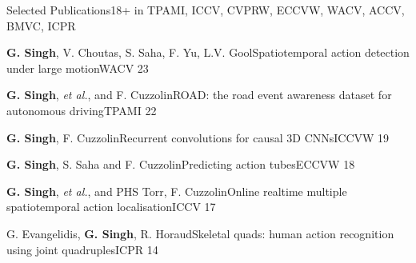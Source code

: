 \documentclass{resume} %
\begin{document}
\vspace{0.1in}
\begin{rSection}{Selected Publications}{18+\footnotesize{ in TPAMI, ICCV, CVPRW, ECCVW, WACV, ACCV, BMVC, ICPR}}
  \begin{pSubsection}{\textbf{G. Singh}, V. Choutas, S. Saha, F. Yu, L.V. Gool}{Spatiotemporal action detection under large motion}{WACV}{ 23}\end{pSubsection}
  \begin{pSubsection}{\textbf{G. Singh}, \textit{et al.}, and
    F. Cuzzolin}{ROAD: the road event awareness dataset for autonomous driving}{TPAMI}{ 22}\end{pSubsection}
  \begin{pSubsection}{\textbf{G. Singh}, F. Cuzzolin}{Recurrent convolutions for causal 3D CNNs}{ICCVW}{ 19}\end{pSubsection}
  \begin{pSubsection}{\textbf{G. Singh}, S. Saha and F. Cuzzolin}{Predicting action tubes}{ECCVW}{ 18}\end{pSubsection}
  \begin{pSubsection}{\textbf{G. Singh}, \textit{et al.}, and PHS Torr, F. Cuzzolin}{Online realtime multiple spatiotemporal action localisation}{ICCV}{ 17}\end{pSubsection}
  \begin{pSubsection}{G. Evangelidis, \textbf{G. Singh}, R. Horaud}{Skeletal quads: human action recognition using joint quadruples}{ICPR}{ 14}\end{pSubsection}
  
  \end{rSection}
\end{document}
